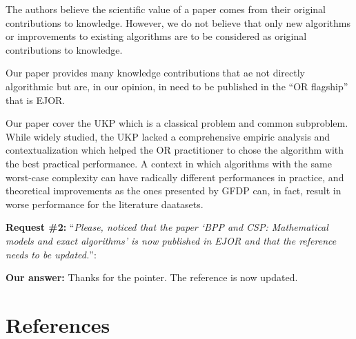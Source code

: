 \documentclass{elsarticle}
\begin{document}
The authors believe the scientific value of a paper comes from their original contributions to knowledge.
However, we do not believe that only new algorithms or improvements to existing algorithms are to be considered as original contributions to knowledge.

Our paper provides many knowledge contributions that ae not directly algorithmic but are, in our opinion, in need to be published in the ``OR flagship'' that is EJOR.

Our paper cover the UKP which is a classical problem and common subproblem. While widely studied, the UKP lacked a comprehensive empiric analysis and contextualization which helped the OR practitioner to chose the algorithm with the best practical performance. A context in which algorithms with the same worst-case complexity can have radically different performances in practice, and theoretical improvements as the ones presented by GFDP can, in fact, result in worse performance for the literature daatasets.

\textbf{Request \#2:} ``\textit{Please, noticed that the paper `BPP and CSP: Mathematical models and exact algorithms' is now published in EJOR and that the reference needs to be updated.}'': 

\textbf{Our answer:} Thanks for the pointer. The reference is now updated.

\section{References}

%

\end{document}
